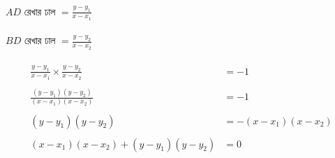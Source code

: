 \documentclass{article}
\begin{document}
	\\ 
	$AD$ রেখার ঢাল $=\frac{y-y_1}{x-x_1}$\\
	\\
	$BD$ রেখার ঢাল $=\frac{y-y_2}{x-x_2}$\\
	\\
	\begin{align*}
		\frac{y-y_1}{x-x_1}\times \frac{y-y_2}{x-x_2}&=-1\\
		\\
		\frac{(y-y_1)(y-y_2)}{(x-x_1)(x-x_2)}&=-1\\
		\\
		(y-y_1)(y-y_2)&=-(x-x_1)(x-x_2)\\
		\\
		(x-x_1)(x-x_2)+(y-y_1)(y-y_2)&=0
	\end{align*}
\end{document}
